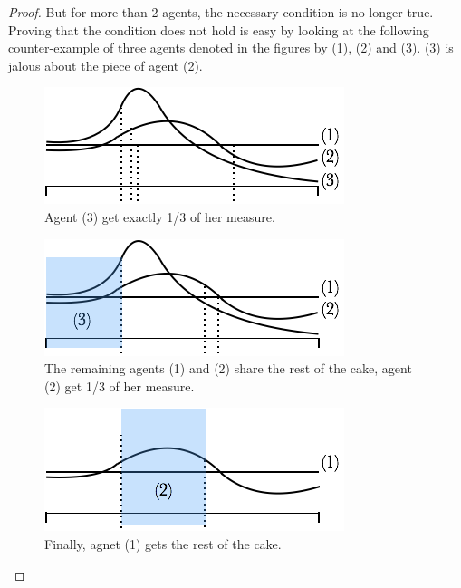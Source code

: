 \begin{proof}
But for more than 2 agents, the necessary condition is no longer true.
Proving that the condition does not hold is easy by looking at the following counter-example
of three agents denoted in the figures by (1), (2) and (3).
(3) is jalous about the piece of agent (2). 
\begin{figure}[htb]
\begin{center}
        \includegraphics[scale=0.6]{FiguresMaths/CakeEnvyFree1}
        \caption{Agent (3) get exactly 1/3 of her measure.}
        \label{Fig:cakeEnvyFree1}
\end{center}
\end{figure}
\begin{figure}[htb]
\begin{center}
        \includegraphics[scale=0.6]{FiguresMaths/CakeEnvyFree2}
        \caption{The remaining agents (1) and (2) share the rest of the cake, agent (2) get 1/3 of her measure.}
        \label{Fig:cakeEnvyFree2}
\end{center}
\end{figure}
\begin{figure}[htb]
\begin{center}
        \includegraphics[scale=0.6]{FiguresMaths/CakeEnvyFree3}
        \caption{Finally, agnet (1) gets the rest of the cake.}
        \label{Fig:cakeEnvyFree3}
\end{center}
\end{figure}

\end{proof}


